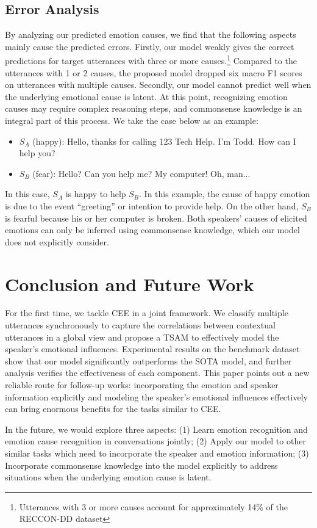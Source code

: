 \documentclass[11pt]{article}
\begin{document}
\subsection{Error Analysis}
By analyzing our predicted emotion causes, we find that the following aspects mainly cause the predicted errors. Firstly, our model weakly gives the correct predictions for target utterances with three or more causes.\footnote{Utterances with 3 or more causes account for approximately 14\% of the RECCON-DD dataset}  Compared to the utterances with 1 or 2 causes, the proposed model dropped six macro F1 scores on utterances with multiple causes. Secondly, our model cannot predict well when the underlying emotional cause is latent. At this point, recognizing emotion causes may require complex reasoning steps, and commonsense knowledge is an integral part of this process. We take the case below as an example:
\begin{itemize}
\item $S_A$ (happy): Hello, thanks for calling 123 Tech Help. I'm Todd. How can I help you?

\item $S_B$ (fear): Hello? Can you help me? My computer! Oh, man...
\end{itemize}
In this case, $S_A$ is happy to help $S_B$. In this example, the cause of happy emotion is due to the event ``greeting'' or intention to provide help. On the other hand, $S_B$ is fearful because his or her computer is broken. Both speakers' causes of elicited emotions can only be inferred using commonsense knowledge, which our model does not explicitly consider.




\section{Conclusion and Future Work}
For the first time, we tackle CEE in a joint framework. We classify multiple utterances synchronously to capture the correlations between contextual utterances in a global view and propose a TSAM to effectively model the speaker's emotional influences.
Experimental results on the benchmark dataset show that our model significantly outperforms the SOTA model, and further analysis verifies the effectiveness of each component. This paper points out a new reliable route for follow-up works: incorporating the emotion and speaker information explicitly and modeling the speaker's emotional influences effectively can bring enormous benefits for the tasks similar to CEE.

In the future, we would explore three aspects: (1) Learn emotion recognition and emotion cause recognition in conversations jointly; (2) Apply our model to other similar tasks which need to incorporate the speaker and emotion information; (3) Incorporate commonsense knowledge into the model explicitly to address situations when the underlying emotion cause is latent.



\end{document}

